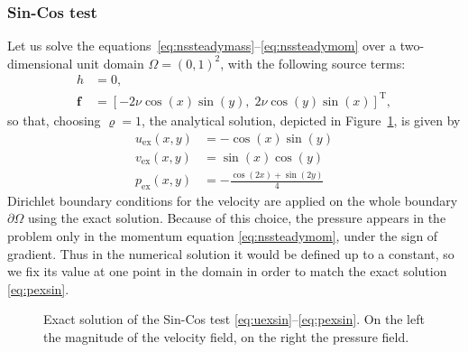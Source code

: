 \subsubsection{Sin-Cos test}
Let us solve the equations~\eqref{eq:nssteadymass}--\eqref{eq:nssteadymom} over 
a two-dimensional unit domain $\Omega=(0,1)^2$, with the following source terms:
\begin{align}
	h &= 0,\\
	\mathbf{f} &= [-2\nu \cos(x) \sin(y), \; 2\nu \cos(y) \sin(x)]^\mathrm{T},
\end{align}
so that, choosing $\varrho=1$, the analytical solution, depicted in 
Figure~\ref{fig:sincosexact}, is given by
\begin{align}
\label{eq:uexsin}	u_\text{ex}(x,y) &= -\cos(x)\sin(y)\\
	v_\text{ex}(x,y) &= \sin(x)\cos(y)\\
\label{eq:pexsin}	p_\text{ex}(x,y) &= -\frac{\cos(2x)+\sin(2y)}{4}
\end{align}
Dirichlet boundary conditions for the velocity are applied on the whole 
boundary $\partial \Omega$ using the exact solution. Because of this choice, 
the pressure appears in the problem only in the momentum equation 
\eqref{eq:nssteadymom}, under the sign of gradient. Thus in the numerical 
solution it would be defined up to a constant, so we fix its value at one point 
in the domain in order to match the exact solution \eqref{eq:pexsin}.
\begin{figure}
	\centering
	\caption[Exact solution of the Sin-Cos test]{Exact solution of the Sin-Cos 
	test \eqref{eq:uexsin}--\eqref{eq:pexsin}. On the left the magnitude of the 
	velocity field, on the right the 
	pressure field.}
	\label{fig:sincosexact}
\end{figure}

